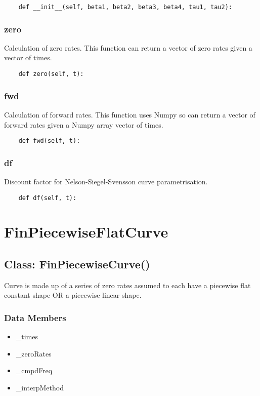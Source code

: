 \documentclass[twoside,11pt]{book}
\begin{document}
\begin{lstlisting}
    def __init__(self, beta1, beta2, beta3, beta4, tau1, tau2):
\end{lstlisting}

\subsubsection*{{\bf zero}}
Calculation of zero rates. This function can return a vector of zero rates given a vector of times.  

\begin{lstlisting}
    def zero(self, t):
\end{lstlisting}

\subsubsection*{{\bf fwd}}
Calculation of forward rates. This function uses Numpy so can return a vector of forward rates given a Numpy array vector of times.  

\begin{lstlisting}
    def fwd(self, t):
\end{lstlisting}

\subsubsection*{{\bf df}}
Discount factor for Nelson-Siegel-Svensson curve  parametrisation.  

\begin{lstlisting}
    def df(self, t):
\end{lstlisting}

\newpage
\section{FinPiecewiseFlatCurve}

\subsection*{Class: FinPiecewiseCurve()}
Curve is made up of a series of zero rates assumed to each have a  piecewise flat constant shape OR a piecewise linear shape.  

\subsubsection*{Data Members}
\begin{itemize}
\item{\_times}
\item{\_zeroRates}
\item{\_cmpdFreq}
\item{\_interpMethod}
\end{itemize}
\end{document}
